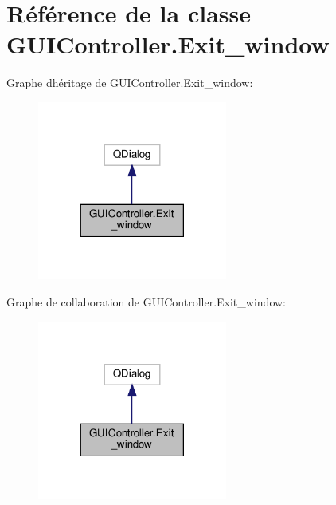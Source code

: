 \hypertarget{classGUIController_1_1Exit__window}{}\section{Référence de la classe G\+U\+I\+Controller.\+Exit\+\_\+window}
\label{classGUIController_1_1Exit__window}


Graphe d\textquotesingle{}héritage de G\+U\+I\+Controller.\+Exit\+\_\+window\+:
\nopagebreak
\begin{figure}[H]
\begin{center}
\leavevmode
\includegraphics[width=177pt]{classGUIController_1_1Exit__window__inherit__graph}
\end{center}
\end{figure}


Graphe de collaboration de G\+U\+I\+Controller.\+Exit\+\_\+window\+:
\nopagebreak
\begin{figure}[H]
\begin{center}
\leavevmode
\includegraphics[width=177pt]{classGUIController_1_1Exit__window__coll__graph}
\end{center}
\end{figure}

